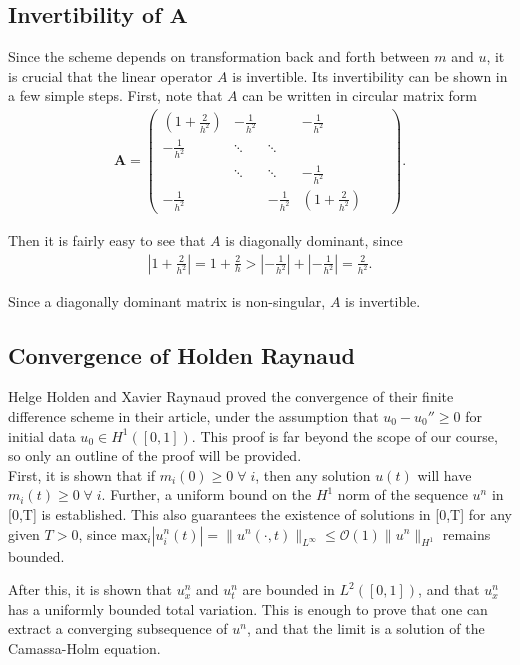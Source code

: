 \subsection*{Invertibility of $\bm{A}$}
Since the scheme depends on transformation back and forth between $m$ and $u$, it is crucial that the linear operator $A$ is invertible. Its invertibility can be shown in a few simple steps. First, note that $A$ can be written in circular matrix form
\begin{align*}
\bm{A} = 
\begin{pmatrix}
  (1 + \frac{2}{h^2}) & -\frac{1}{h^2} &  & -\frac{1}{h^2} \\
  -\frac{1}{h^2} & \ddots & \ddots  &  & &   \\
  & \ddots & \ddots & -\frac{1}{h^2}\\
  -\frac{1}{h^2} & & -\frac{1}{h^2} & (1 + \frac{2}{h^2})
 \end{pmatrix}.
\end{align*}

Then it is fairly easy to see that $A$ is diagonally dominant, since
\begin{align*}
|1 + \frac{2}{h^2}| = 1 + \frac{2}{h}> |-\frac{1}{h^2}| + |-\frac{1}{h^2}| = \frac{2}{h^2}.
\end{align*}

Since a diagonally dominant matrix is non-singular, $A$ is invertible.

\subsection*{Convergence of Holden Raynaud}
Helge Holden and Xavier Raynaud proved the convergence of their finite difference scheme in their article, under the assumption that $u_{0} - u_{0}'' \geq 0$ for initial data $u_{0} \in H^{1}([0,1])$. This proof is far beyond the scope of our course, so only an outline of the proof will be provided. \\

First, it is shown that if $m_{i}(0) \geq 0 \; \forall \;i$, then any solution $u(t)$ will have $m_{i}(t) \geq 0 \; \forall \;i $. Further, a uniform bound on the $H^{1}$ norm of the sequence $u^{n}$ in [0,T] is established. This also guarantees the existence of solutions in [0,T] for any given $T > 0$, since $\text{max}_{i}|u_{i}^{n}(t)| = \|u^{n}(\cdot,t)\|_{L^{\infty}} \leq \mathcal{O}(1) \|u^{n}\|_{H^{1}}$ remains bounded.

After this, it is shown that $u_{x}^{n}$ and $u_{t}^{n}$ are bounded in $L^{2}([0,1])$, and that $u_{x}^{n}$ has a uniformly bounded total variation. This is enough to prove that one can extract a converging subsequence of $u^{n}$, and that the limit is a solution of the Camassa-Holm equation. 

